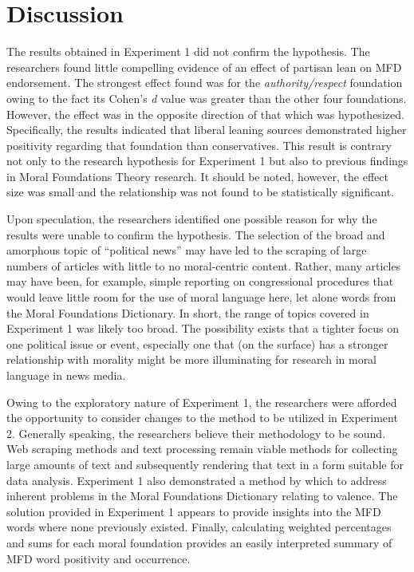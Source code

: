\documentclass[english,,man]{apa6}
\begin{document}
\hypertarget{discussion}{%
\section{Discussion}\label{discussion}}

The results obtained in Experiment 1 did not confirm the hypothesis. The researchers found little compelling evidence of an effect of partisan lean on MFD endorsement. The strongest effect found was for the \emph{authority/respect} foundation owing to the fact its Cohen's \emph{d} value was greater than the other four foundations. However, the effect was in the opposite direction of that which was hypothesized. Specifically, the results indicated that liberal leaning sources demonstrated higher positivity regarding that foundation than conservatives. This result is contrary not only to the research hypothesis for Experiment 1 but also to previous findings in Moral Foundations Theory research. It should be noted, however, the effect size was small and the relationship was not found to be statistically significant.

Upon speculation, the researchers identified one possible reason for why the results were unable to confirm the hypothesis. The selection of the broad and amorphous topic of \enquote{political news} may have led to the scraping of large numbers of articles with little to no moral-centric content. Rather, many articles may have been, for example, simple reporting on congressional procedures that would leave little room for the use of moral language here, let alone words from the Moral Foundations Dictionary. In short, the range of topics covered in Experiment 1 was likely too broad. The possibility exists that a tighter focus on one political issue or event, especially one that (on the surface) has a stronger relationship with morality might be more illuminating for research in moral language in news media.

Owing to the exploratory nature of Experiment 1, the researchers were afforded the opportunity to consider changes to the method to be utilized in Experiment 2. Generally speaking, the researchers believe their methodology to be sound. Web scraping methods and text processing remain viable methods for collecting large amounts of text and subsequently rendering that text in a form suitable for data analysis. Experiment 1 also demonstrated a method by which to address inherent problems in the Moral Foundations Dictionary relating to valence. The solution provided in Experiment 1 appears to provide insights into the MFD words where none previously existed. Finally, calculating weighted percentages and sums for each moral foundation provides an easily interpreted summary of MFD word positivity and occurrence.
\end{document}
